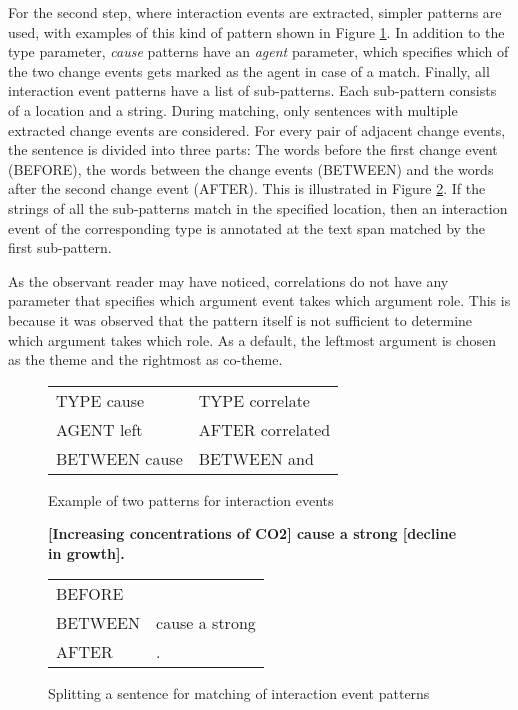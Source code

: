 For the second step, where interaction events are extracted, simpler patterns are used, with examples of this kind of pattern shown in Figure \ref{iep_exmpl}. In addition to the type parameter, \emph{cause} patterns have an \emph{agent} parameter, which specifies which of the two change events gets marked as the agent in case of a match. Finally, all interaction event patterns have a list of sub-patterns. Each sub-pattern consists of a location and a string. During matching, only sentences with multiple extracted change events are considered. For every pair of adjacent change events, the sentence is divided into three parts: The words before the first change event (BEFORE), the words between the change events (BETWEEN) and the words after the second change event (AFTER). This is illustrated in Figure \ref{iep_split}. If the strings of all the sub-patterns match in the specified location, then an interaction event of the corresponding type is annotated at the text span matched by the first sub-pattern. 

As the observant reader may have noticed, correlations do not have any parameter that specifies which argument event takes which argument role. This is because it was observed that the pattern itself is not sufficient to determine which argument takes which role. As a default, the leftmost argument is chosen as the theme and the rightmost as co-theme.

\begin{figure}
\begin{center}
\begin{tabular}{  l  l  }
TYPE cause & TYPE correlate \\
AGENT left	& AFTER correlated \\
BETWEEN cause & BETWEEN and \\
\end{tabular}
\end{center}
\caption{Example of two patterns for interaction events}
\label{iep_exmpl}
\end{figure}

\begin{figure}
\begin{center}

\textbf{[Increasing concentrations of CO2] cause a strong [decline in growth].}

\begin{tabular}{  l  l  }
BEFORE & \\
BETWEEN & cause a strong \\
AFTER & . \\
\end{tabular}

\end{center}
\caption{Splitting a sentence for matching of interaction event patterns}
\label{iep_split}
\end{figure}

